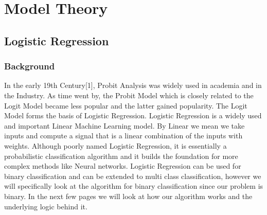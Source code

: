 \part{Model Theory}
\chapter{Logistic Regression}

\section{Background }

{In the early 19th Century[1], Probit Analysis was widely used in academia and in the Industry. As time went by, the Probit Model which is closely related to the Logit Model became less popular and the latter gained popularity. The Logit Model forms the basis of Logistic Regression. Logistic Regression is a widely used and important Linear Machine Learning model. By Linear we mean we take inputs and compute a signal that is a linear combination of the inputs with weights. Although poorly named Logistic Regression, it is essentially a probabilistic classification algorithm and it builds the foundation for more complex methods like Neural networks. Logistic Regression can be used for binary classification and can be extended to multi class classification, however we will specifically look at the algorithm for binary classification since our problem is binary. In the next few pages we will look at how our algorithm works and the underlying logic behind it.}

